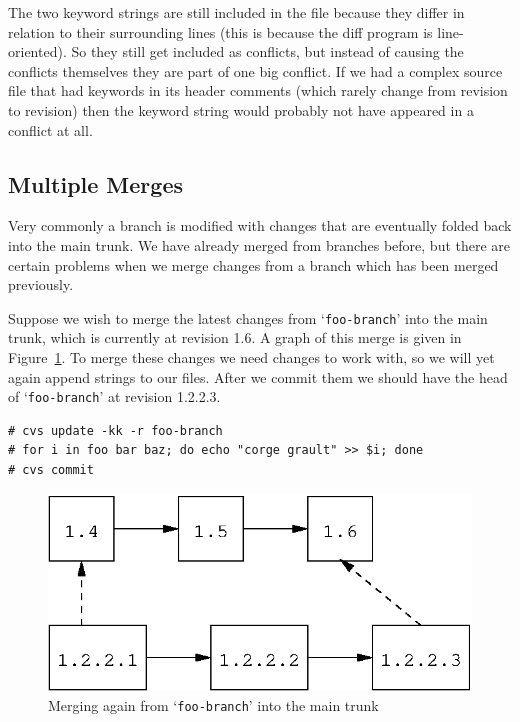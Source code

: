\documentclass[12pt,letterpaper]{article}
\newcommand{\cmd}[1]{`\texttt{#1}'}
\begin{document}
The two keyword strings are still included in the file because they differ in
relation to their surrounding lines (this is because the diff program is
line-oriented).  So they still get included as conflicts, but instead of
causing the conflicts themselves they are part of one big conflict.  If we had
a complex source file that had keywords in its header comments (which rarely
change from revision to revision) then the keyword string would probably not
have appeared in a conflict at all.

\subsection{Multiple Merges}

Very commonly a branch is modified with changes that are eventually folded
back into the main trunk.  We have already merged from branches before, but
there are certain problems when we merge changes from a branch which has been
merged previously.

Suppose we wish to merge the latest changes from \cmd{foo-branch} into the
main trunk, which is currently at revision 1.6.  A graph of this merge is
given in Figure~\ref{fig:walkthru-mulbmerge}.  To merge these changes we need
changes to work with, so we will yet again append strings to our files.  After
we commit them we should have the head of \cmd{foo-branch} at revision
1.2.2.3.

\begin{Verbatim}
# cvs update -kk -r foo-branch
# for i in foo bar baz; do echo "corge grault" >> $i; done
# cvs commit
\end{Verbatim}

\begin{figure}[htb]
\begin{center}
\includegraphics{walkthru-mulbmerge.eps}
\end{center}
\caption{Merging again from \cmd{foo-branch} into the main trunk}
\label{fig:walkthru-mulbmerge}
\end{figure}
\end{document}
